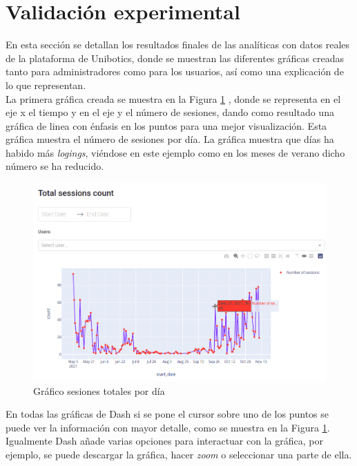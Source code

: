 \section{Validación experimental}

En esta sección se detallan los resultados finales de las analíticas con datos reales de la plataforma de Unibotics, donde se muestran las diferentes gráficas creadas tanto para administradores como para los usuarios, así como una explicación de lo que representan.\\

La primera gráfica creada se muestra en la Figura \ref{fig:sesion} , donde se representa en el eje x el tiempo y en el eje y el número de sesiones, dando como resultado una gráfica de linea con énfasis en los puntos para una mejor visualización. Esta gráfica muestra el número de sesiones por día. La gráfica muestra que días ha habido más \textit{logings}, viéndose en este ejemplo como en los meses de verano dicho número se ha reducido.



\begin{figure}[H]
    \centering
    \includegraphics[width=18cm, keepaspectratio]{img/sesion.png}
    \caption{Gráfico sesiones totales por día}
    \label{fig:sesion}
\end{figure}
\newpage
En todas las gráficas de Dash si se pone el cursor sobre uno de los puntos se puede ver la información con mayor detalle, como se muestra en la Figura \ref{fig:sesion}. Igualmente Dash añade varias opciones para interactuar con la gráfica, por ejemplo, se puede descargar la gráfica, hacer \textit{zoom} o seleccionar una parte de ella. \\

